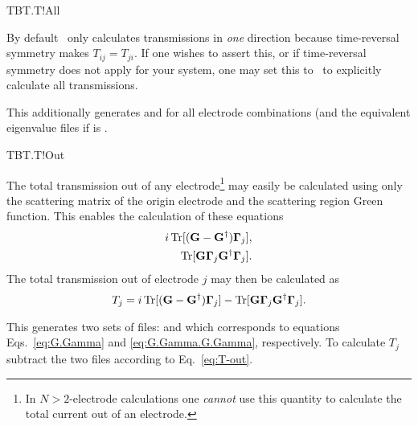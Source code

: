 \begin{fdflogicalF}{TBT.T!All}

  By default \tbtrans\ only calculates transmissions in \emph{one}
  direction because time-reversal symmetry makes $T_{ij}=T_{ji}$. If
  one wishes to assert this, or if time-reversal symmetry does not
  apply for your system, one may set this to \fdftrue\ to explicitly
  calculate all transmissions.

  This additionally generates  and
   for all electrode combinations (and the
  equivalent eigenvalue files if  is \fdftrue.

\end{fdflogicalF}

\begin{fdflogicalF}{TBT.T!Out}
  
  The total transmission out of any electrode\footnote{In
      $N>2$-electrode calculations one \emph{cannot} use this quantity
      to calculate the total current out of an electrode.} may easily
  be calculated using only the scattering matrix of the origin
  electrode and the scattering region Green function.
  This enables the calculation of these equations
  \begin{align}
    i\operatorname{Tr}[(\mathbf G - \mathbf G^\dagger)\boldsymbol \Gamma_j],
    \label{eq:G.Gamma}
    \\
    \operatorname{Tr}[\mathbf G \boldsymbol \Gamma_j \mathbf G^\dagger\boldsymbol
    \Gamma_j].
    \label{eq:G.Gamma.G.Gamma}
  \end{align}
  The total transmission out of electrode $j$ may then be calculated
  as
  \begin{equation}
    \label{eq:T-out}
    T_j = i\operatorname{Tr}[(\mathbf G - \mathbf G^\dagger)\boldsymbol \Gamma_j] 
    -
    \operatorname{Tr}[\mathbf G \boldsymbol \Gamma_j \mathbf G^\dagger\boldsymbol \Gamma_j].
  \end{equation}

  This generates two sets of files:  and
   which corresponds to equations
  Eqs.~\eqref{eq:G.Gamma} and \eqref{eq:G.Gamma.G.Gamma},
  respectively. To calculate $T_j$ subtract the two files
  according to Eq.~\eqref{eq:T-out}.
  
\end{fdflogicalF}

